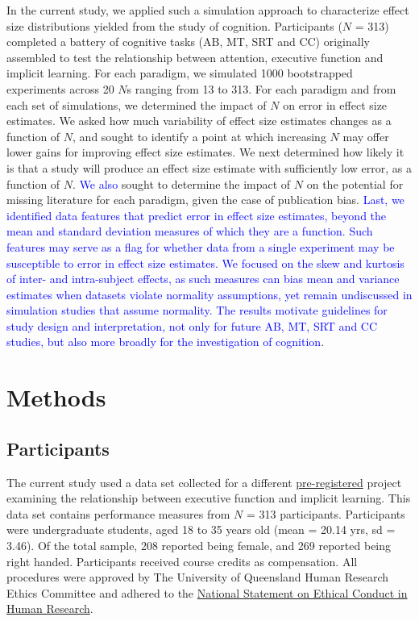 \documentclass[
  man]{apa6}
\begin{document}
In the current study, we applied such a simulation approach to characterize effect size distributions yielded from the study of cognition. Participants (\(N\) = 313) completed a battery of cognitive tasks (AB, MT, SRT and CC) originally assembled to test the relationship between attention, executive function and implicit learning. For each paradigm, we simulated 1000 bootstrapped experiments across 20 \(N\)s ranging from 13 to 313. For each paradigm and from each set of simulations, we determined the impact of \(N\) on error in effect size estimates. We asked how much variability of effect size estimates changes as a function of \(N\), and sought to identify a point at which increasing \(N\) may offer lower gains for improving effect size estimates. We next determined how likely it is that a study will produce an effect size estimate with sufficiently low error, as a function of \(N\). \textcolor{blue}{We also} sought to determine the impact of \(N\) on the potential for missing literature for each paradigm, given the case of publication bias. \textcolor{blue}{Last, we identified data features that predict error in effect size estimates, beyond the mean and standard deviation measures of which they are a function. Such features may serve as a flag for whether data from a single experiment may be susceptible to error in effect size estimates. We focused on the skew and kurtosis of inter- and intra-subject effects, as such measures can bias mean and variance estimates when datasets violate normality assumptions, yet remain undiscussed in simulation studies that assume normality. The results motivate guidelines for study design and interpretation, not only for future AB, MT, SRT and CC studies, but also more broadly for the investigation of cognition}.

\hypertarget{methods}{%
\section{Methods}\label{methods}}

\label{sec:Method}

\hypertarget{participants}{%
\subsection{Participants}\label{participants}}

\label{sec:Participants}

The current study used a data set collected for a different \href{https://osf.io/nxysg}{pre-registered} project examining the relationship between executive function and implicit learning. This data set contains performance measures from \(N\) = 313 participants. Participants were undergraduate students, aged 18 to 35 years old (mean = 20.14 yrs, sd = 3.46). Of the total sample, 208 reported being female, and 269 reported being right handed. Participants received course credits as compensation. All procedures were approved by The University of Queensland Human Research Ethics Committee and adhered to the \href{https://www.nhmrc.gov.au/about-us/publications/national-statement-ethical-conduct-human-research-2007-updated-2018}{National Statement on Ethical Conduct in Human Research}.
\end{document}
